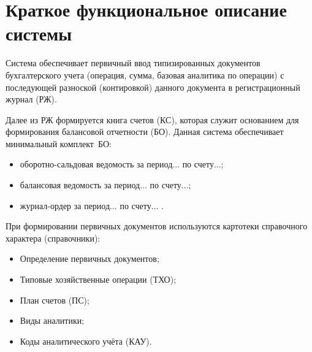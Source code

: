 \section{Краткое функциональное описание системы}

Система обеспечивает первичный ввод типизированных документов бухгалтерского учета
(операция, сумма, базовая аналитика по операции) с последующей разноской (контировкой) данного документа в регистрационный журнал (РЖ). 

Далее из РЖ формируется книга счетов (КС), которая служит основанием для формирования балансовой отчетности (БО).
Данная система обеспечивает минимальный комплект~БО:
\begin{itemize}
    \item оборотно-сальдовая ведомость за период... по счету...;
    \item балансовая ведомость за период... по счету...;
    \item журнал-ордер за период... по счету... .
\end{itemize}

При формировании первичных документов используются картотеки справочного характера (справочники):
\begin{itemize}
    \item Определение первичных документов;
    \item Типовые хозяйственные операции (ТХО);
    \item План счетов (ПС);
    \item Виды аналитики;
    \item Коды аналитического учёта (КАУ).
\end{itemize}

\newpage
